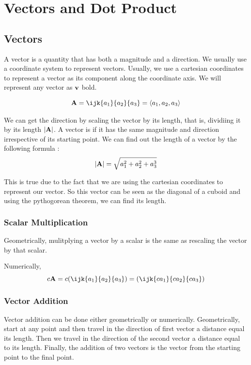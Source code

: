 

\chapter{Vectors and Dot Product}

\bigbreak
\section{Vectors}

A vector is a quantity that has both a magnitude and a direction.
We usually use a coordinate system to represent vectors.
Usually, we use a cartesian coordinates to represent a vector as its component along the coordinate axis.
We will represent any vector as ${\bf v}$ bold.

$$ {\bf A} = \ijk{a_1}{a_2}{a_3} = \left< a_1, a_2, a_3 \right> $$

We can get the direction by scaling the vector by its length, that is, dividiing it by its length $|{\bf A}|$.
A vector is if it has the same magnitude and direction irrespective of its starting point.
We can find out the length of a vector by the following formula : $$ |{\bf A}| = \sqrt{a_1^2 + a_2^2 + a_3^3} $$

This is true due to the fact that we are using the cartesian coordinates to represent our vector.
So this vector can be seen as the diagonal of a cuboid and using the pythogorean theorem, we can find its length.

\subsection{Scalar Multiplication}
Geometrically, mulitplying a vector by a scalar is the same as rescaling the vector by that scalar.

Numerically, $$ c {\bf A} = c (\ijk{a_1}{a_2}{a_3}) = (\ijk{ca_1}{ca_2}{ca_3}) $$

\subsection{Vector Addition}

Vector addition can be done either geometrically or numerically.
Geometrically, start at any point and then travel in the direction of first vector a distance equal its length.
Then we travel in the direction of the second vector a distance equal to its length.
Finally, the addition of two vectors is the vector from the starting point to the final point.

